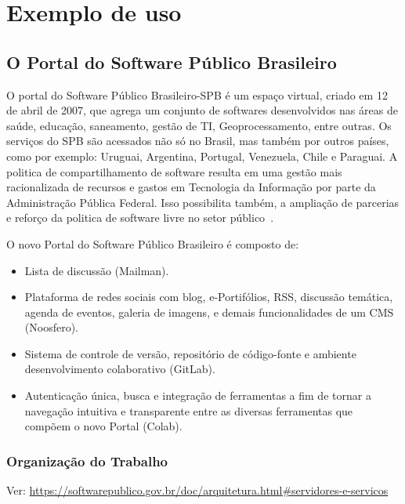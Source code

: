 \chapter{Exemplo de uso}
\label{est}
\section{O Portal do Software Público Brasileiro}
\label{est:sof}

O portal do Software Público Brasileiro-SPB é um espaço virtual, criado em 12 de abril de 2007, que agrega um conjunto de softwares desenvolvidos nas áreas de saúde, educação, saneamento, gestão de TI, Geoprocessamento, entre outras. Os serviços do SPB são acessados não só no Brasil, mas também por outros países, como por exemplo: Uruguai, Argentina, Portugal, Venezuela, Chile e Paraguai. A politica de compartilhamento de software resulta em uma gestão mais racionalizada de recursos e gastos em Tecnologia da Informação por parte da Administração Pública Federal. Isso possibilita também, a ampliação de parcerias e reforço da politica de software livre no setor público~\cite{spb}.

O novo Portal do Software Público Brasileiro é composto de:


\begin{itemize}
    \item Lista de discussão (Mailman).
    \item Plataforma de redes sociais com blog, e-Portifólios, RSS, discussão 
    temática, agenda de eventos, galeria de imagens, e demais funcionalidades de um CMS (Noosfero).
    \item Sistema de controle de versão, repositório de código-fonte e ambiente 
    desenvolvimento colaborativo (GitLab).
    \item Autenticação única, busca e integração de ferramentas a fim de tornar 
    a navegação intuitiva e transparente entre as diversas ferramentas que compõem 
    o novo Portal (Colab).
\end{itemize}

\subsection{Organização do Trabalho}
Ver: \url{https://softwarepublico.gov.br/doc/arquitetura.html#servidores-e-servicos}







